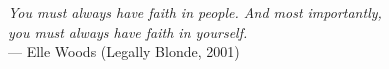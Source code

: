 \thispagestyle{empty}

\vspace*{3cm}

\begin{flushright}
{\small	\textit{You must always have faith in people. And most importantly, \\you must always have faith in yourself.} \\ \medskip
	--- Elle Woods (Legally Blonde, 2001)}
\end{flushright}


